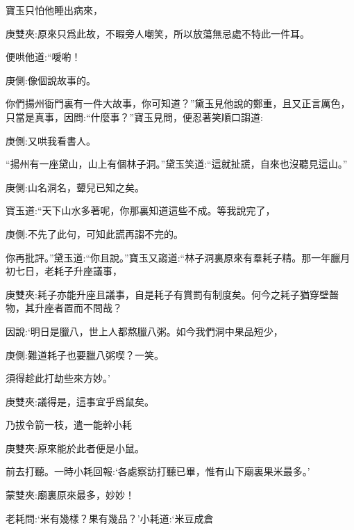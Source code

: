 \begin{parag}
    寶玉只怕他睡出病來，\begin{note}庚雙夾:原來只爲此故，不暇旁人嘲笑，所以放蕩無忌處不特此一件耳。\end{note}便哄他道:“噯喲！\begin{note}庚側:像個說故事的。\end{note}你們揚州衙門裏有一件大故事，你可知道？”黛玉見他說的鄭重，且又正言厲色，只當是真事，因問:“什麼事？”寶玉見問，便忍著笑順口謅道:\begin{note}庚側:又哄我看書人。\end{note}“揚州有一座黛山，山上有個林子洞。”黛玉笑道:“這就扯謊，自來也沒聽見這山。”\begin{note}庚側:山名洞名，顰兒已知之矣。\end{note}寶玉道:“天下山水多著呢，你那裏知道這些不成。等我說完了，\begin{note}庚側:不先了此句，可知此謊再謅不完的。\end{note}你再批評。”黛玉道:“你且說。”寶玉又謅道:“林子洞裏原來有羣耗子精。那一年臘月初七日，老耗子升座議事，\begin{note}庚雙夾:耗子亦能升座且議事，自是耗子有賞罰有制度矣。何今之耗子猶穿壁齧物，其升座者置而不問哉？\end{note}因說:‘明日是臘八，世上人都熬臘八粥。如今我們洞中果品短少，\begin{note}庚側:難道耗子也要臘八粥喫？一笑。\end{note}須得趁此打劫些來方妙。’\begin{note}庚雙夾:議得是，這事宜乎爲鼠矣。\end{note}乃拔令箭一枝，遣一能幹小耗\begin{note}庚雙夾:原來能於此者便是小鼠。\end{note}前去打聽。一時小耗回報:‘各處察訪打聽已畢，惟有山下廟裏果米最多。’\begin{note}蒙雙夾:廟裏原來最多，妙妙！\end{note}老耗問:‘米有幾樣？果有幾品？’小耗道:‘米豆成倉
\end{parag}
